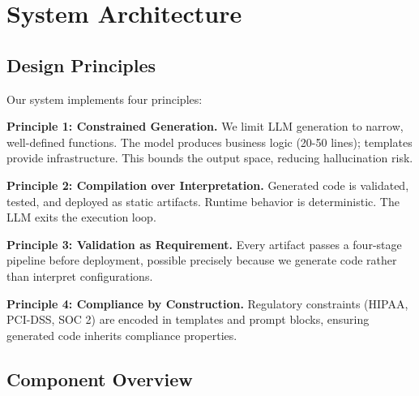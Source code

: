 \documentclass[11pt]{article}
\begin{document}
\section{System Architecture}
\label{sec:architecture}

\subsection{Design Principles}

Our system implements four principles:

\textbf{Principle 1: Constrained Generation.} We limit LLM generation to narrow, well-defined functions. The model produces business logic (20-50 lines); templates provide infrastructure. This bounds the output space, reducing hallucination risk.

\textbf{Principle 2: Compilation over Interpretation.} Generated code is validated, tested, and deployed as static artifacts. Runtime behavior is deterministic. The LLM exits the execution loop.

\textbf{Principle 3: Validation as Requirement.} Every artifact passes a four-stage pipeline before deployment, possible precisely because we generate code rather than interpret configurations.

\textbf{Principle 4: Compliance by Construction.} Regulatory constraints (HIPAA, PCI-DSS, SOC 2) are encoded in templates and prompt blocks, ensuring generated code inherits compliance properties.

\subsection{Component Overview}
\end{document}
